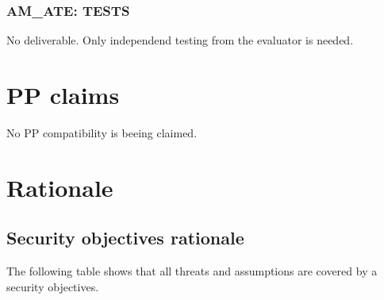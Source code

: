 \documentclass[12pt,english]{scrbook}
\begin{document}
\subsection{AM{\_}ATE: TESTS}

No deliverable. Only independend testing from the evaluator is needed.





\chapter{PP claims}

No PP compatibility is beeing claimed.




\chapter{Rationale}





\section{Security objectives rationale}

The following table shows that all threats and assumptions are covered
by a security objectives. 
\end{document}
